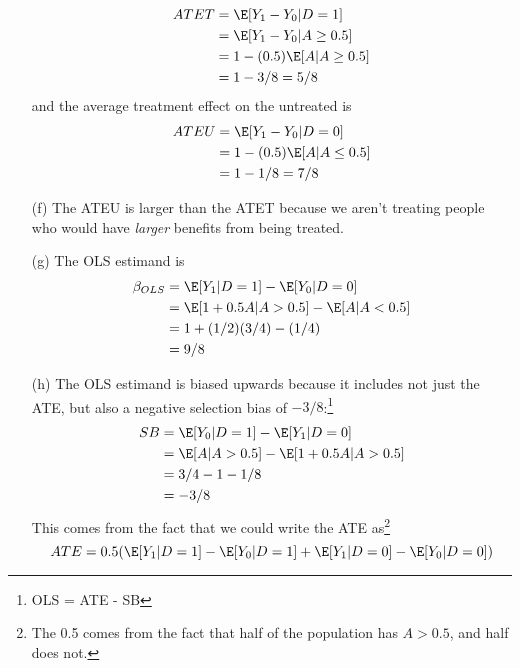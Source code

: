\documentclass[12pt]{article}
\begin{document}
\begin{enumerate}
\begin{align*}
            ATET & = \E[Y_1 - Y_0 | D = 1]          \\
                 & = \E[Y_1 - Y_0 | A \ge 0.5]      \\
                 & = 1 - (0.5)\E[A | A \ge 0.5]     \\
                 & = 1 - 3/8 = 5/8 
        \end{align*}
        and the average treatment effect on the untreated is 
        \begin{align*}
            ATEU & = \E[Y_1 - Y_0 | D = 0]          \\
                 & = 1 - (0.5)\E[A | A \leq 0.5]    \\
                 & = 1 - 1/8 = 7/8
        \end{align*}
    \item[(f)] The ATEU is larger than the ATET because we aren't treating people who would have \emph{larger} benefits from being treated. 
    \item[(g)] The OLS estimand is 
        \begin{align*}
            \beta_{OLS} & = \E[Y_1 | D=1] - \E[Y_0 | D=0]       \\
                        & = \E[1 + 0.5A | A>0.5] - \E[A | A<0.5]\\
                        & = 1 + (1/2)(3/4) - (1/4)              \\
                        & = 9/8
        \end{align*}
    \item[(h)] The OLS estimand is biased upwards because it includes not just the ATE, but also a negative selection bias of $-3/8$:\footnote{OLS = ATE - SB} 
        \begin{align*}
            SB & = \E[Y_0 | D=1] - \E[Y_1 | D=0]         \\
               & = \E[A | A> 0.5] - \E[1 + 0.5A | A>0.5] \\
               & = 3/4 - 1 - 1/8                         \\
               & = -3/8
        \end{align*}
        This comes from the fact that we could write the ATE as\footnote{The 0.5 comes from the fact that half of the population has $A>0.5$, and half does not.}
        \[ATE = 0.5(\E[Y_1 | D=1] - \E[Y_0 | D=1] + \E[Y_1 | D=0]  - \E[Y_0 | D=0]) \]
\end{enumerate}
\end{document}
